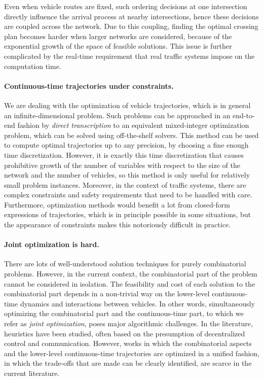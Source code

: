 \documentclass[a4paper]{report}
\theoremstyle{definition}
\theoremstyle{plain}
\begin{document}
Even when vehicle routes are fixed, such ordering decisions at one intersection
directly influence the arrival process at nearby intersections, hence these
decisions are coupled across the network.
%
Due to this coupling, finding the optimal crossing plan becomes harder when
larger networks are considered, because of the exponential growth of the space
of feasible solutions.
%
This issue is further complicated by the real-time requirement that real traffic
systems impose on the computation time.

\paragraph{Continuous-time trajectories under constraints.}

We are dealing with the optimization of vehicle trajectories, which is in
general an infinite-dimensional problem.
%
Such problems can be approached in an end-to-end fashion by
\textit{direct transcription} to an equivalent mixed-integer optimization
problem, which can be solved using off-the-shelf solvers. This method can be
used to compute optimal trajectories up to any precision, by choosing a fine
enough time discretization. However, it is exactly this time discretization that
causes prohibitive growth of the number of variables with respect to the size of
the network and the number of vehicles, so this method is only useful for
relatively small problem instances.
%
Moreover, in the context of traffic systems, there are complex constraints and
safety requirements that need to be handled with care.
%
Furthermore, optimization methods would benefit a lot from closed-form
expressions of trajectories, which is in principle possible in some situations,
but the appearance of constraints makes this notoriously difficult in practice.

\paragraph{Joint optimization is hard.}

There are lots of well-understood solution techniques for purely combinatorial
problems.
%
However, in the current context, the combinatorial part of the problem cannot be
considered in isolation. The feasibility and cost of each solution to the
combinatorial part depends in a non-trivial way on the lower-level
continuous-time dynamics and interactions between vehicles.
%
In other words, simultaneously optimizing the combinatorial part and the
continuous-time part, to which we refer as \emph{joint optimization}, poses
major algorithmic challenges.
%
In the literature, heuristics have been studied, often based on the presumption
of decentralized control and communication.
%
However, works in which the combinatorial aspects and the lower-level
continuous-time trajectories are optimized in a unified fashion, in which the
trade-offs that are made can be clearly identified, are scarce in the current
literature.
\end{document}
